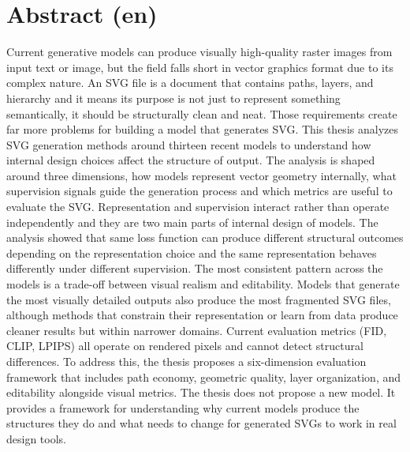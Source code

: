 
\section*{Abstract (en)}
Current generative models can produce visually high-quality raster images from input
text or image, but the field falls short in vector graphics format due to its complex
nature. An SVG file is a document that contains paths, layers, and hierarchy and it
means its purpose is not just to represent something semantically, it should be structurally clean and neat. 
Those requirements create far more problems for 
building a model that generates SVG. This thesis analyzes SVG generation methods around thirteen recent models 
to understand how internal design choices affect the structure of output. The analysis is shaped around three dimensions, 
how models represent vector geometry internally, what supervision signals guide the generation process and which metrics 
are useful to evaluate the SVG. Representation and supervision interact rather than operate independently and they are two 
main parts of internal design of models. The analysis showed that same loss function can produce different structural outcomes 
depending on the representation choice and the same representation behaves differently under different supervision. 
The most consistent pattern across the models is a trade-off between visual realism and editability. Models that generate the 
most visually detailed outputs also produce the most fragmented SVG files, although methods that constrain their representation 
or learn from data produce cleaner results but within narrower domains. Current evaluation metrics (FID, CLIP, LPIPS) all operate 
on rendered pixels and cannot detect structural differences. To address this, the thesis proposes a six-dimension evaluation 
framework that includes path economy, geometric quality, layer organization, and editability alongside visual metrics. 
The thesis does not propose a new model. It provides a framework for understanding why current models produce the structures 
they do and what needs to change for generated SVGs to work in real design tools.


